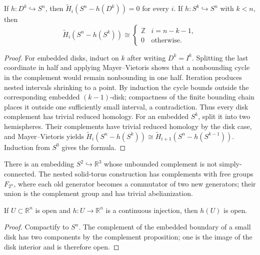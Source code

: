 \begin{proposition}
\label{prop:homology-sphere-complement-disk-sphere}

If $h:D^k\hookrightarrow S^n$, then $\widetilde H_i(S^n-h(D^k))=0$ for every $i$.  If $h:S^k\hookrightarrow S^n$ with $k<n$, then
\[
\widetilde H_i(S^n-h(S^k))\cong\begin{cases}\mathbb{Z}&i=n-k-1,\\0&\text{otherwise}.\end{cases}
\]
\end{proposition}
\begin{proof}
\sketch For embedded disks, induct on $k$ after writing $D^k=I^k$. Splitting
the last coordinate in half and applying Mayer--Vietoris shows that a
nonbounding cycle in the complement would remain nonbounding in one half.
Iteration produces nested intervals shrinking to a point. By induction the
cycle bounds outside the corresponding embedded $(k-1)$-disk; compactness of
the finite bounding chain places it outside one sufficiently small interval,
a contradiction. Thus every disk complement has trivial reduced homology.
For an embedded $S^k$, split it into two hemispheres. Their complements have
trivial reduced homology by the disk case, and Mayer--Vietoris yields
$\widetilde H_i(S^n-h(S^k))\cong
\widetilde H_{i+1}(S^n-h(S^{k-1}))$. Induction from $S^0$ gives the formula.
\end{proof}

\begin{example}
\label{ex:alexander-horned-sphere}

There is an embedding $S^2\hookrightarrow\mathbb{R}^3$ whose unbounded complement is not simply-connected.  The nested solid-torus construction has complements with free groups $F_{2^n}$, where each old generator becomes a commutator of two new generators; their union is the complement group and has trivial abelianization.
\end{example}

\begin{theorem}
\label{thm:invariance-of-domain-general}

If $U\subset\mathbb{R}^n$ is open and $h:U\to\mathbb{R}^n$ is a continuous injection, then $h(U)$ is open.
\end{theorem}
\begin{proof}
\sketch Compactify to $S^n$.  The complement of the embedded boundary of a small disk has two components by the complement proposition; one is the image of the disk interior and is therefore open.
\end{proof}

